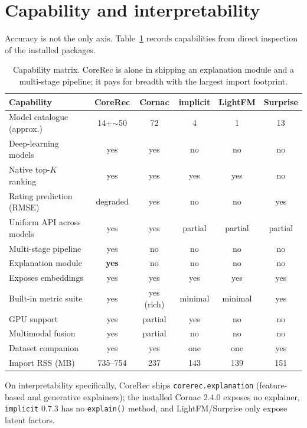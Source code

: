 \documentclass[10pt]{article}
\begin{document}
\section{Capability and interpretability}
Accuracy is not the only axis. Table~\ref{tab:cap} records capabilities from
direct inspection of the installed packages.

\begin{table}[h]\centering\footnotesize
\begin{tabular}{lccccc}
\toprule
Capability & CoreRec & Cornac & implicit & LightFM & Surprise \\
\midrule
Model catalogue (approx.) & 14+$\sim$50 & 72 & 4 & 1 & 13 \\
Deep-learning models & yes & yes & no & no & no \\
Native top-$K$ ranking & yes & yes & yes & yes & no \\
Rating prediction (RMSE) & degraded & yes & no & no & yes \\
Uniform API across models & yes & yes & partial & partial & partial \\
Multi-stage pipeline & yes & no & no & no & no \\
Explanation module & \textbf{yes} & no & no & no & no \\
Exposes embeddings & yes & yes & yes & yes & yes \\
Built-in metric suite & yes & yes (rich) & minimal & minimal & yes \\
GPU support & yes & partial & yes & no & no \\
Multimodal fusion & yes & partial & no & no & no \\
Dataset companion & yes & yes & one & one & yes \\
Import RSS (MB) & 735--754 & 237 & 143 & 139 & 151 \\
\bottomrule
\end{tabular}
\caption{Capability matrix. CoreRec is alone in shipping an explanation module
and a multi-stage pipeline; it pays for breadth with the largest import
footprint.}
\label{tab:cap}
\end{table}

On interpretability specifically, CoreRec ships
\texttt{corerec.explanation} (feature-based and generative explainers); the
installed Cornac 2.4.0 exposes no explainer, \texttt{implicit} 0.7.3 has no
\texttt{explain()} method, and LightFM/Surprise only expose latent factors.
\end{document}

